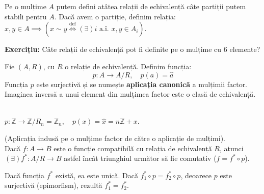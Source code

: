 Pe o mulțime $A$ putem defini atâtea relații de echivalență câte partiții putem stabili pentru $A$.
Dacă avem o partiție, definim relația: $x, y \in A \implies \left( x \sim y \overset{\text{def}}{\iff} (\exists) i \text{ a.î. } x, y \in A_i \right)$.

\textbf{Exercițiu:} Câte relații de echivalență pot fi definite pe o mulțime cu 6 elemente?

\begin{definition}
Fie $(A, R)$, cu $R$ o relație de echivalență. Definim funcția:
$$ p : A \rightarrow A/R, \quad p(a) = \hat{a} $$
Funcția $p$ este surjectivă și se numește \textbf{aplicația canonică} a mulțimii factor. Imaginea inversă a unui element din mulțimea factor este o clasă de echivalență.
\end{definition}

\begin{example}\mbox{}\\
$p: \mathbb{Z} \rightarrow \mathbb{Z}/R_n = \mathbb{Z}_n, \quad p(x) = \hat{x} = n\mathbb{Z} + x$.
\end{example}

\begin{theorem}
(Aplicația indusă pe o mulțime factor de către o aplicație de mulțimi). \\
Dacă $f: A \rightarrow B$ este o funcție compatibilă cu relația de echivalență $R$, atunci $(\exists) f^* : A/R \rightarrow B$ astfel încât triunghiul următor să fie comutativ ($f = f^* \circ p$).

\begin{center}
\hspace{2cm}
\end{center}
\end{theorem}

\begin{remark}
Dacă funcția $f^*$ există, ea este unică. Dacă $f_1^* \circ p = f_2^* \circ p$, deoarece $p$ este surjectivă (epimorfism), rezultă $f_1^* = f_2^*$.
\end{remark}

